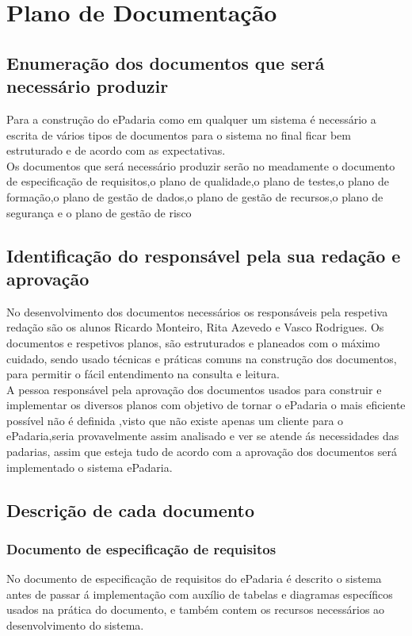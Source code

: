 \chapter{Plano de Documentação}
\label{plano_de_documentacao}

\section{Enumeração dos documentos que será necessário produzir}
Para a construção do ePadaria como em qualquer um sistema é necessário a escrita de vários tipos de documentos para o sistema no final ficar bem estruturado e de acordo com as expectativas.\\
Os documentos que será necessário produzir serão no
meadamente o documento de especificação de requisitos,o plano de qualidade,o plano de testes,o plano de formação,o plano de gestão de dados,o plano de gestão de recursos,o plano de segurança e o plano de gestão de risco
\section{Identificação do responsável pela sua redação e aprovação}
No desenvolvimento dos documentos necessários os responsáveis pela respetiva redação são os alunos Ricardo Monteiro, Rita Azevedo e Vasco Rodrigues. Os documentos e respetivos planos, são estruturados e planeados com o máximo cuidado, sendo usado técnicas e práticas comuns na construção dos documentos, para permitir o fácil entendimento na consulta e leitura.\\
A pessoa responsável pela aprovação dos documentos usados para construir e implementar os diversos planos com objetivo de tornar o ePadaria o mais eficiente possível não é definida ,visto que não existe apenas um cliente para o ePadaria,seria provavelmente assim analisado e ver se atende ás necessidades das padarias, assim que esteja tudo de acordo com a aprovação dos documentos será implementado o sistema ePadaria.


\section{Descrição de cada documento}
\subsection{Documento de especificação de requisitos}
No documento de especificação de requisitos do ePadaria é descrito o sistema antes de passar á implementação com auxílio de tabelas e diagramas específicos usados na prática do documento, e também contem os recursos necessários ao desenvolvimento do sistema. 
